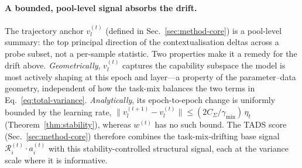 \paragraph{A bounded, pool-level signal absorbs the drift.}
The trajectory anchor $v_l^{(t)}$ (defined in
Sec.~\ref{sec:method-core}) is a pool-level summary: the top
principal direction of the contextualisation deltas across a probe
subset, not a per-sample statistic. Two properties make it a
remedy for the drift above. \emph{Geometrically}, $v_l^{(t)}$
captures the capability subspace the model is most actively shaping
at this epoch and layer---a property of the parameter--data
geometry, independent of how the task-mix balances the two terms in
Eq.~\ref{eq:total-variance}. \emph{Analytically}, its
epoch-to-epoch change is uniformly bounded by the learning rate,
$\|v_l^{(t+1)} - v_l^{(t)}\| \le (2 C_\Sigma/\gamma_{\min})\,\eta_t$
(Theorem~\ref{thm:stability}), whereas $w^{(t)}$ has no such bound.
The \textsc{TADS} score (Sec.~\ref{sec:method-core}) therefore
combines the task-mix-drifting base signal
$\mathcal{R}_i^{(t)} \cdot a_i^{(t)}$ with this
stability-controlled structural signal, each at the variance scale
where it is informative.

